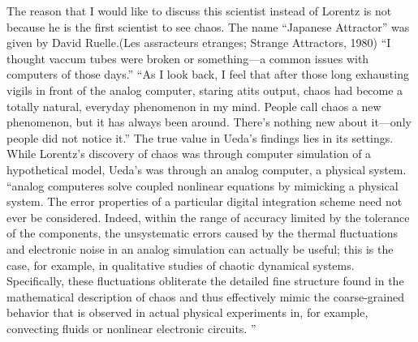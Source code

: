 \documentclass[12pt,twoside,draft]{book}
\begin{document}
The reason that I would like to discuss this scientist instead of Lorentz is not because he is the first scientist to see chaos.
The name ``Japanese Attractor'' was given by David Ruelle.(Les assracteurs etranges; Strange Attractors, 1980)
``I thought vaccum tubes were broken or something---a common issues with computers of those days.'' \citep{lorentzbook} %
``As I look back, I feel that after those long exhausting vigils in front of the analog computer, staring atits output, chaos had become a totally natural, everyday phenomenon in my mind.
People call chaos a new phenomenon, but it has always been around.
There's nothing new about it---only people did not notice it.''\cite[p.27]{ueda-abraham}
The true value in Ueda's findings lies in its settings.
While Lorentz's discovery of chaos was through computer simulation of a hypothetical model, Ueda's was through an analog computer, a physical system.
``analog computeres solve coupled nonlinear equations by mimicking a physical system.
The error properties of a particular digital integration scheme need not ever be considered.
Indeed, within the range of accuracy limited by the tolerance of the components, the unsystematic errors caused by the thermal fluctuations and electronic noise in an analog simulation can actually be useful; this is the case, for example, in qualitative studies of chaotic dynamical systems.
Specifically, these fluctuations obliterate the detailed fine structure found in the mathematical description of chaos and thus effectively mimic the coarse-grained behavior that is observed in actual physical experiments in, for example, convecting fluids or nonlinear electronic circuits.
''\cite[p.383]{campbell}
\end{document}
